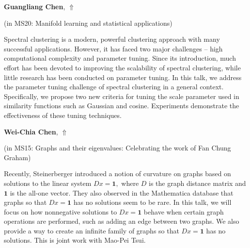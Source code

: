 \documentclass[ILAS2025-program.tex]{subfiles}
\begin{document}
\hypertarget{down0073}{}\begin{ilasabstract}
    
\textbf{Guangliang Chen},  \hfill \hyperlink{up0073}{$\Uparrow$}
    
    
(in {\color{mstitle}MS20: Manifold learning and statistical applications})
        
\mtskip
    Spectral clustering is a modern, powerful clustering approach with many successful applications. However, it has faced two major challenges -- high computational complexity and parameter tuning. Since its introduction, much effort has been devoted to improving the scalability of spectral clustering, while little research has been conducted on parameter tuning. In this talk, we address the parameter tuning challenge of spectral clustering in a general context. Specifically, we propose two new criteria for tuning the scale parameter used in similarity functions such as Gaussian and cosine. Experiments demonstrate the effectiveness of these tuning techniques. 
\end{ilasabstract}
    

\hypertarget{down0139}{}\begin{ilasabstract}
    
\textbf{Wei-Chia Chen},  \hfill \hyperlink{up0139}{$\Uparrow$}
    
    
(in {\color{mstitle}MS15: Graphs and their eigenvalues: Celebrating the work of Fan Chung Graham})
        
\mtskip
    Recently, Steinerberger introduced a notion of curvature on graphs based on solutions to the linear system $Dx=\mathbf{1},$ where $D$ is the graph distance matrix and $\mathbf{1}$ is the all-one vector. 
They also observed in the Mathematica database that graphs so that $Dx=\mathbf{1}$ has no solutions seem to be rare. 
In this talk, we will focus on how nonnegative solutions to $Dx=\mathbf{1}$ behave when certain graph operations are performed, such as adding an edge between two graphs. We also provide a way to create an infinite family of graphs so that $Dx=\mathbf{1}$ has no solutions. This is joint work with Mao-Pei Tsui.

\end{ilasabstract}
    
\end{document}
